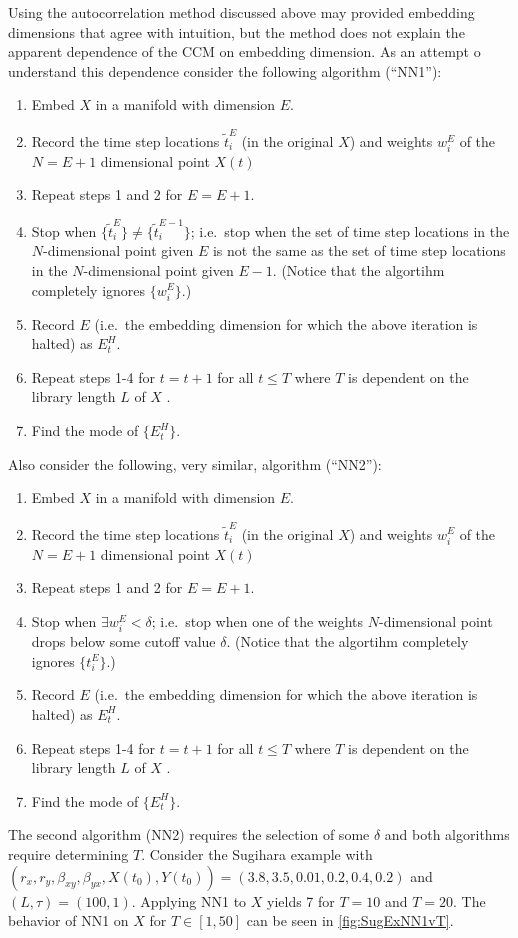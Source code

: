 \documentclass[a4paper,11pt]{article}
\begin{document}
Using the autocorrelation method discussed above may provided embedding dimensions that agree with intuition, but the method does not explain the apparent dependence of the CCM on embedding dimension.  As an attempt o understand this dependence consider the following algorithm (``NN1''): 
\begin{enumerate}
\item Embed $X$ in a manifold with dimension $E$.
\item Record the time step locations $\tilde{t}^E_i$ (in the original $X$) and weights $w^E_i$ of the $N=E+1$ dimensional point $X(t)$ 
\item Repeat steps 1 and 2 for $E=E+1$.
\item Stop when $\{\tilde{t}_i^E\} \neq \{\tilde{t}_i^{E-1}\}$; i.e.\ stop when the set of time step locations in the $N$-dimensional point given $E$ is not the same as the set of time step locations in the $N$-dimensional point given $E-1$.  (Notice that the algortihm completely ignores $\{w_i^E\}$.)
\item Record $E$ (i.e.\ the embedding dimension for which the above iteration is halted) as $E^H_t$.
\item Repeat steps 1-4 for $t=t+1$ for all $t\le T$ where $T$ is dependent on the library length $L$ of $X$ .
\item Find the mode of $\{E_t^H\}$.
\end{enumerate}
Also consider the following, very similar, algorithm (``NN2''):
\begin{enumerate}
\item Embed $X$ in a manifold with dimension $E$.
\item Record the time step locations $\tilde{t}^E_i$ (in the original $X$) and weights $w^E_i$ of the $N=E+1$ dimensional point $X(t)$ 
\item Repeat steps 1 and 2 for $E=E+1$.
\item Stop when $\exists w^E_i < \delta$; i.e.\ stop when one of the weights $N$-dimensional point drops below some cutoff value $\delta$.  (Notice that the algortihm completely ignores $\{t_i^E\}$.)
\item Record $E$ (i.e.\ the embedding dimension for which the above iteration is halted) as $E^H_t$.
\item Repeat steps 1-4 for $t=t+1$ for all $t\le T$ where $T$ is dependent on the library length $L$ of $X$ .
\item Find the mode of $\{E_t^H\}$.
\end{enumerate}
The second algorithm (NN2) requires the selection of some $\delta$ and both algorithms require determining $T$.  Consider the Sugihara example with $\left(r_x,r_y,\beta_{xy},\beta_{yx},X(t_0),Y(t_0)\right) = \left(3.8,3.5,0.01,0.2,0.4,0.2\right)$ and $\left(L,\tau\right) = \left(100,1\right)$.  Applying NN1 to $X$ yields 7 for $T=10$ and $T=20$.  The behavior of NN1 on $X$ for $T\in[1,50]$ can be seen in \ref{fig:SugExNN1vT}.
\end{document}
